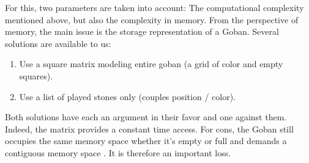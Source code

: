 \documentclass{report}
\begin{document}
For this, two parameters are taken into account: The computational complexity mentioned above, but also the complexity in memory.
From the perspective of memory, the main issue is the storage representation of a Goban. Several solutions are available to us: \\

\begin{enumerate}
\item Use a square matrix modeling entire goban (a grid of color and empty squares).
\item Use a list of played stones only (couples position / color).
\end{enumerate}
Both solutions have each an argument in their favor and one against them. 
Indeed, the matrix provides a constant time access. For cons, the Goban still occupies the same memory space whether it's empty or full and demands a contiguous memory space . It is therefore an important loss. \\
\end{document}
